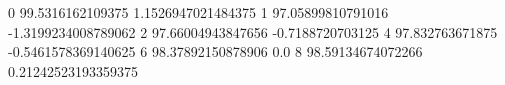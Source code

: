 0 99.5316162109375 1.1526947021484375
1 97.05899810791016 -1.3199234008789062
2 97.66004943847656 -0.7188720703125
4 97.832763671875 -0.5461578369140625
6 98.37892150878906 0.0
8 98.59134674072266 0.21242523193359375
